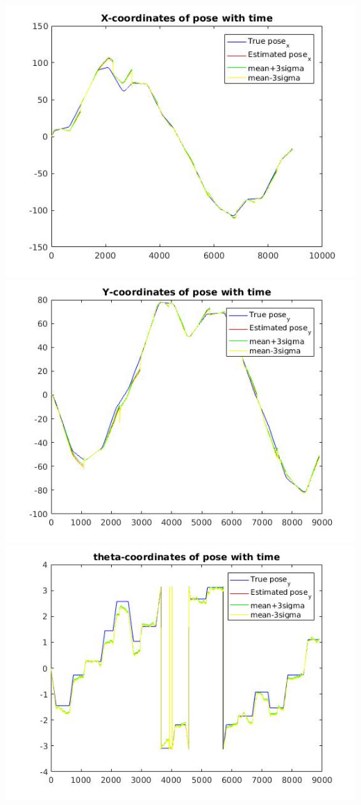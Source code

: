\documentclass[a4paper,fleqn,11pt]{article}
\theoremstyle{mytheor}
\begin{document}
\begin{center}
\includegraphics[scale = 0.37]{../images/EKF-default1-xvt.jpg}
\includegraphics[scale = 0.37]{../images/EKF-default1-yvt.jpg}
\includegraphics[scale = 0.37]{../images/EKF-default1-avt.jpg}

\end{center}
\end{document}
